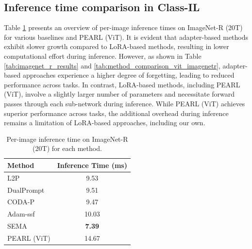 \documentclass[10pt]{article} %
\begin{document}
\subsection{Inference time comparison in Class-IL}

Table \ref{tab:imagenet-r-inference} presents an overview of per-image inference times on ImageNet-R (20T) for various baselines and PEARL (ViT). It is evident that adapter-based methods exhibit slower growth compared to LoRA-based methods, resulting in lower computational effort during inference. However, as shown in Table \ref{tab:imagenet_r_results} and \ref{tab:method_comparison_vit_imagenetr}, adapter-based approaches experience a higher degree of forgetting, leading to reduced performance across tasks. In contrast, LoRA-based methods, including PEARL (ViT), involve a slightly larger number of parameters and necessitate forward passes through each sub-network during inference. While PEARL (ViT) achieves superior performance across tasks, the additional overhead during inference remains a limitation of LoRA-based approaches, including our own.


\begin{table}[h]
\caption{Per-image inference time on ImageNet-R (20T) for each method.}
\centering
\begin{tabular}{lc}
\toprule
Method & Inference Time (ms) \\
\midrule
L2P  \cite{wang2022learning}      & 9.53 \\
DualPrompt \cite{wang2022dualprompt} & 9.51 \\
CODA-P \cite{smith2023coda}     & 9.47 \\
Adam-ssf    \cite{10.1007/s11263-024-02218-0}   & 10.03 \\
SEMA  \cite{SEMA}     & \textbf{7.39} \\
\midrule
PEARL (ViT)      & 14.67 \\
\bottomrule
\end{tabular}
\label{tab:imagenet-r-inference}
\end{table}
\end{document}
